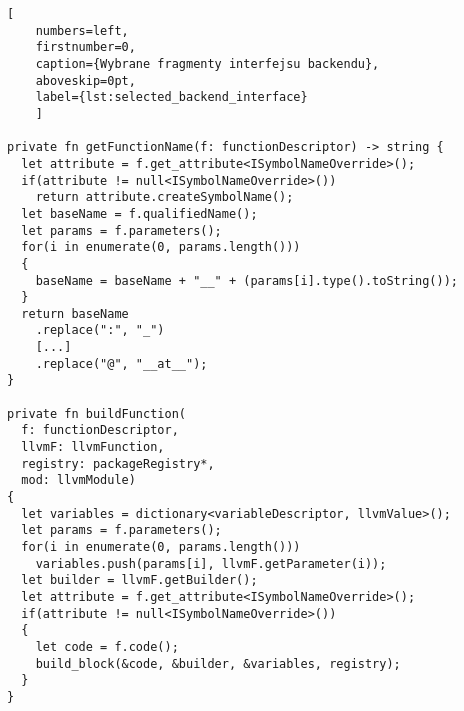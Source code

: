 \begin{minipage}{\linewidth}
  
  \begin{lstlisting}[
    numbers=left,
    firstnumber=0,
    caption={Wybrane fragmenty interfejsu backendu},
    aboveskip=0pt,
    label={lst:selected_backend_interface}
    ]

private fn getFunctionName(f: functionDescriptor) -> string {
  let attribute = f.get_attribute<ISymbolNameOverride>();
  if(attribute != null<ISymbolNameOverride>())
    return attribute.createSymbolName();
  let baseName = f.qualifiedName();
  let params = f.parameters();
  for(i in enumerate(0, params.length()))
  {
    baseName = baseName + "__" + (params[i].type().toString());
  }
  return baseName
    .replace(":", "_")
    [...]
    .replace("@", "__at__");
}

private fn buildFunction(
  f: functionDescriptor,
  llvmF: llvmFunction,
  registry: packageRegistry*,
  mod: llvmModule)
{
  let variables = dictionary<variableDescriptor, llvmValue>();
  let params = f.parameters();
  for(i in enumerate(0, params.length()))
    variables.push(params[i], llvmF.getParameter(i));
  let builder = llvmF.getBuilder();
  let attribute = f.get_attribute<ISymbolNameOverride>();
  if(attribute != null<ISymbolNameOverride>())
  {
    let code = f.code();
    build_block(&code, &builder, &variables, registry);
  }
}

\end{lstlisting}
\end{minipage}

